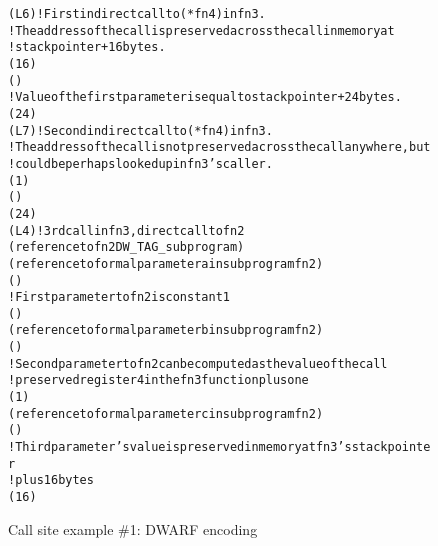 \begin{figure}[ht]
\begin{dwflisting}
\begin{alltt}
    \DWTAGcallsite
        \DWATcallreturnpc(L6) ! First indirect call to (*fn4) in fn3.
        ! The address of the call is preserved across the call in memory at
        ! stack pointer + 16 bytes.
        \DWATcalltarget(\DWOPbregthree{} 16 \DWOPderef)
        \DWTAGcallsiteparameter
            \DWATlocation(\DWOPregzero)
            ! Value of the first parameter is equal to stack pointer + 24 bytes.
            \DWATcallvalue(\DWOPbregthree{} 24)
    \DWTAGcallsite
        \DWATcallreturnpc(L7) ! Second indirect call to (*fn4) in fn3.
        ! The address of the call is not preserved across the call anywhere, but
        ! could be perhaps looked up in fn3's caller.
        \DWATcalltarget(\DWOPentryvalue{} 1 \DWOPregone)
        \DWTAGcallsiteparameter
            \DWATlocation(\DWOPregzero)
            \DWATcallvalue(\DWOPbregthree{} 24)
    \DWTAGcallsite
        \DWATcallreturnpc(L4) ! 3rd call in fn3, direct call to fn2
        \DWATcallorigin(reference to fn2 DW_TAG_subprogram)
        \DWTAGcallsiteparameter
            \DWATcallparameter(reference to formal parameter a in subprogram fn2)
            \DWATlocation(\DWOPregzero)
            ! First parameter to fn2 is constant 1
            \DWATcallvalue(\DWOPlitone)
        \DWTAGcallsiteparameter
            \DWATcallparameter(reference to formal parameter b in subprogram fn2)
            \DWATlocation(\DWOPregone)
            ! Second parameter to fn2 can be computed as the value of the call
            !   preserved register 4 in the fn3 function plus one
            \DWATcallvalue(\DWOPbregfour{} 1)
        \DWTAGcallsiteparameter
            \DWATcallparameter(reference to formal parameter c in subprogram fn2)
            \DWATlocation(\DWOPregtwo)
            ! Third parameter's value is preserved in memory at fn3's stack pointer
            !   plus 16 bytes
            \DWATcallvalue(\DWOPbregthree{} 16 \DWOPderef)
\end{alltt}
\end{dwflisting}
\caption{Call site example \#1: DWARF encoding}
\label{fig:callsiteexample1dwarf}
\end{figure}

